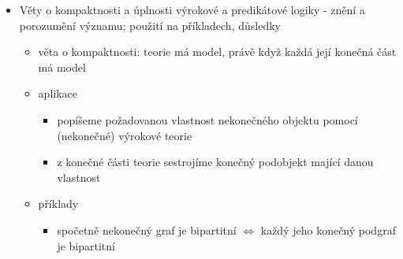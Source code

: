 \begin{itemize}
\begin{itemize}
\begin{itemize}
\begin{itemize}
\item pokud existuje, je $\varphi$ tablo dokazatelný z $T$, píšeme $T\vdash\varphi$
\item podobně definujeme tablo zamítnutí s $\text T\varphi$ v kořeni, tablo zamítnutelnost se značí $T\vdash \neg\varphi$
\end{itemize}
\item tablo je sporné, pokud je každá jeho větev sporná
\item větev je sporná, pokud obsahuje položky $\text T\psi$ a $\text F\psi$ pro nějaký výrok $\psi$, jinak je bezesporná
\item tablo je dokončené, pokud je každá jeho větev dokončená
\item větev je dokončená\dots{}
\begin{itemize}
\item pokud je sporná
\item nebo pokud je každá její položka na této větvi redukovaná a pokud větev zároveň obsahuje položku s T pro každý axiom teorie
\end{itemize}
\item položka je redukovaná na dané větvi, pokud obsahuje pouze výrokovou proměnnou nebo se na dané větvi vyskytuje jako kořen atomického tabla (tedy došlo k jejímu rozvoji na dané větvi)
\item v predikátové logice navíc řešíme kvantifikátory - položky typu \textit{svědek} a \textit{všichni}
\end{itemize}
\end{itemize}
\item Věty o kompaktnosti a úplnosti výrokové a predikátové logiky - znění a porozumění významu; použití na příkladech, důsledky
\begin{itemize}
\item věta o kompaktnosti: teorie má model, právě když každá její konečná část má model
\item aplikace
\begin{itemize}
\item popíšeme požadovanou vlastnost nekonečného objektu pomocí (nekonečné) výrokové teorie
\item z konečné části teorie sestrojíme konečný podobjekt mající danou vlastnost
\end{itemize}
\item příklady
\begin{itemize}
\item spočetně nekonečný graf je bipartitní $\iff$ každý jeho konečný podgraf je bipartitní

\end{itemize}
\end{itemize}
\end{itemize}
